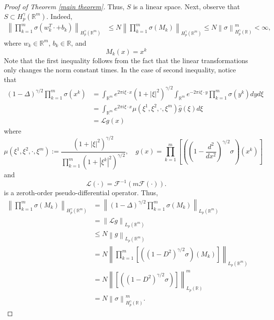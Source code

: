 \documentclass[10pt,a4paper]{amsart}
\newcommand\bR{\mathbb{R}}
\newcommand\cF{\mathcal{F}}
\newcommand\cL{\mathcal{L}}
\begin{document}
\begin{proof}[Proof of Theorem \ref{main theorem}]
Thus, $S$ is a linear space. Next, observe that $S\subset H_p^\gamma(\bR^{m})$. Indeed,
\begin{equation*}
\begin{aligned}
\left\|   \prod_{k = 1}^{m} \sigma(w_{k}^{T}\cdot + b_{k})   \right\|_{H_{p}^{\gamma}(\bR^{m})}
& \leq N\left\|   \prod_{k = 1}^{m} \sigma(M_{k})   \right\|_{H_{p}^{\gamma}(\bR^{m})} 
\leq N\left\|    \sigma   \right\|_{H_{p}^{\gamma}(\bR)}^{m}<\infty,
\end{aligned}
\end{equation*}
where $w_{k}\in \bR^{m}$, $b_{k}\in \bR$, and 
\begin{equation*}
M_{k}(x) = x^{k}
\end{equation*} 
Note that the first inequality follows from the fact that the linear transformations only changes the norm constant times. In the case of second inequality, notice that
\begin{equation*}
\begin{aligned}
  (1-\Delta)^{\gamma/2}\prod_{k = 1}^{m} \sigma(x^{k})  
&= \int_{\bR^{m}} e^{2\pi i \xi \cdot x}(1+|\xi|^{2})^{\gamma/2}\int_{\bR^{m}} e^{-2\pi i \xi \cdot y} \prod_{k = 1}^{m}\sigma(y^{k}) dy d\xi  \\
&= \int_{\bR^{m}} e^{2\pi i \xi \cdot x} \mu(\xi^{1},\xi^{2},\cdot,\xi^{m}) \hat g(\xi) d\xi \\
&= \cL g(x)
\end{aligned}
\end{equation*}
where 
\begin{equation*}
\mu(\xi^{1},\xi^{2},\cdot,\xi^{m}) := \frac{(1+|\xi|^{2})^{\gamma/2}}{\prod_{k = 1}^{m} (1+|\xi^{k}|^{2})^{\gamma/2}}, \quad g(x) = \prod_{k = 1}^{m}\left[ \left( \left( 1-\frac{d^{2}}{dx^{2}} \right)^{\gamma/2}\sigma \right)(x^{k}) \right]
\end{equation*}
and 
\begin{equation*}
\cL(\cdot) = \cF^{-1}(m \cF(\cdot)).
\end{equation*}
is a zeroth-order pseudo-differential operator. Thus, 
\begin{equation*}
\begin{aligned}
\left\|   \prod_{k = 1}^{m} \sigma(M_{k})   \right\|_{H_{p}^{\gamma}(\bR^{m})} 
&= \left\|   (1-\Delta)^{\gamma/2} \prod_{k = 1}^{m} \sigma(M_{k})   \right\|_{L_{p}(\bR^{m})} \\
&= \left\| \cL g   \right\|_{L_{p}(\bR^{m})} \\
&\leq N\left\|  g   \right\|_{L_{p}(\bR^{m})} \\
&= N\left\| \prod_{k = 1}^{m}\left[ \left( (1-D^{2})^{\gamma/2}\sigma \right)(M_{k}) \right]   \right\|_{L_{p}(\bR^{m})} \\
&= N\left\| \left[ \left( (1-D^{2})^{\gamma/2}\sigma \right) \right]   \right\|_{L_{p}(\bR)}^{m} \\
&= N\left\| \sigma   \right\|_{H_{p}^{\gamma}(\bR)}^{m}.
\end{aligned}
\end{equation*}




\end{proof}
\end{document}

